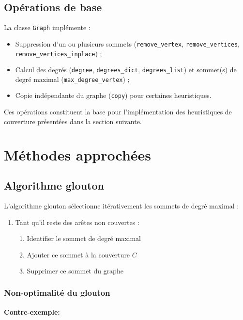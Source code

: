 \documentclass[11pt,a4paper]{article}
\begin{document}
\subsection{Opérations de base}
La classe \texttt{Graph} implémente :
\begin{itemize}
    \item Suppression d’un ou plusieurs sommets (\texttt{remove\_vertex}, \texttt{remove\_vertices}, \texttt{remove\_vertices\_inplace}) ;
    \item Calcul des degrés (\texttt{degree}, \texttt{degrees\_dict}, \texttt{degrees\_list}) et sommet(s) de degré maximal (\texttt{max\_degree\_vertex}) ;
    \item Copie indépendante du graphe (\texttt{copy}) pour certaines heuristiques.
\end{itemize}

Ces opérations constituent la base pour l’implémentation des heuristiques de couverture présentées dans la section suivante.


\section{Méthodes approchées}

\subsection{Algorithme glouton}

L'algorithme glouton sélectionne itérativement les sommets de degré maximal :

\begin{enumerate}
    \item Tant qu'il reste des arêtes non couvertes :
    \begin{enumerate}
        \item Identifier le sommet de degré maximal
        \item Ajouter ce sommet à la couverture $C$
        \item Supprimer ce sommet du graphe
    \end{enumerate}
\end{enumerate}

\subsubsection{Non-optimalité du glouton}

\paragraph{Contre-exemple:}
\end{document}

